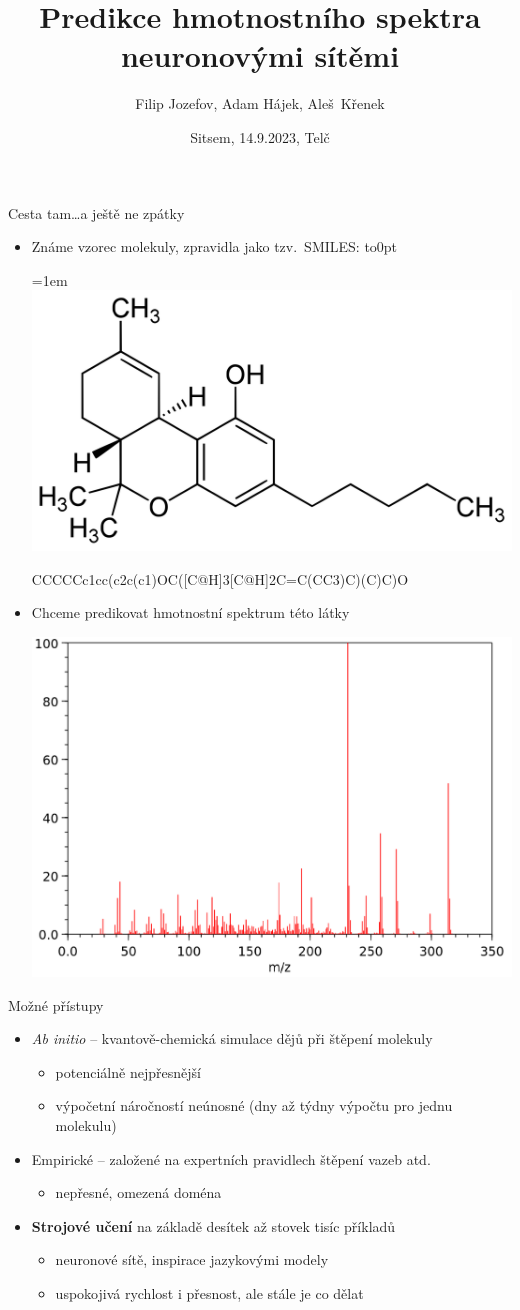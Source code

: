 \documentclass[aspectratio=169]{beamer}
\title{Predikce hmotnostního spektra neuronovými sítěmi}
\author{Filip Jozefov, Adam Hájek, Aleš~Křenek}
\date{Sitsem, 14.9.2023, Telč}
\begin{document}
\makeatletter
\maketitle

\begin{frame}
{Cesta tam}{\dots a ještě ne zpátky}

\begin{itemize}
\item Známe vzorec molekuly, zpravidla jako tzv.\ SMILES: \qquad
\vbox to0pt{
\hsize=1em
\includegraphics[height=12ex]{thc-formula}
\par
\vss
}

\medskip
CCCCCc1cc(c2c(c1)OC([C@H]3[C@H]2C=C(CC3)C)(C)C)O 


\medskip
\pause
\item Chceme predikovat hmotnostní spektrum této látky 

\medskip
\includegraphics[width=.4\hsize]{thc-spec}
\end{itemize}
\end{frame}

\begin{frame}
{Možné přístupy}
\begin{itemize}
\item \emph{Ab initio} -- kvantově-chemická simulace dějů při štěpení molekuly
\begin{itemize}
\item potenciálně nejpřesnější
\item výpočetní náročností neúnosné (dny až týdny výpočtu pro jednu molekulu)
\end{itemize}
\medskip
\item Empirické -- založené na expertních pravidlech štěpení vazeb atd.
\begin{itemize}
\item nepřesné, omezená doména
\end{itemize}
\medskip
\item \textbf{Strojové učení} na základě desítek až stovek tisíc příkladů
\begin{itemize}
\item neuronové sítě, inspirace jazykovými modely
\item uspokojivá rychlost i přesnost, ale stále je co dělat
\end{itemize}
\end{itemize}
\end{frame}
\end{document}
